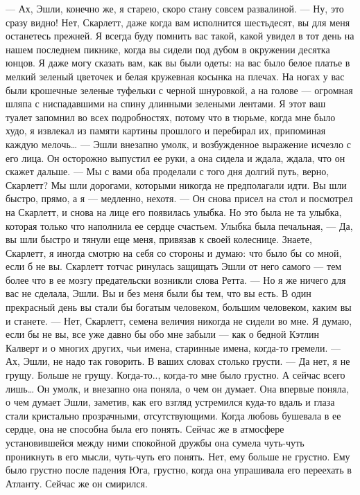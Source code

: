 — Ах, Эшли, конечно же, я старею, скоро стану совсем развалиной.
— Ну, это сразу видно! Нет, Скарлетт, даже когда вам исполнится шестьдесят, вы для меня останетесь прежней. Я всегда буду помнить вас такой, какой увидел в тот день на нашем последнем пикнике, когда вы сидели под дубом в окружении десятка юнцов. Я даже могу сказать вам, как вы были одеты: на вас было белое платье в мелкий зеленый цветочек и белая кружевная косынка на плечах. На ногах у вас были крошечные зеленые туфельки с черной шнуровкой, а на голове — огромная шляпа с ниспадавшими на спину длинными зелеными лентами. Я этот ваш туалет запомнил во всех подробностях, потому что в тюрьме, когда мне было худо, я извлекал из памяти картины прошлого и перебирал их, припоминая каждую мелочь… — Эшли внезапно умолк, и возбужденное выражение исчезло с его лица. Он осторожно выпустил ее руки, а она сидела и ждала, ждала, что он скажет дальше. — Мы с вами оба проделали с того дня долгий путь, верно, Скарлетт? Мы шли дорогами, которыми никогда не предполагали идти. Вы шли быстро, прямо, а я — медленно, нехотя. — Он снова присел на стол и посмотрел на Скарлетт, и снова на лице его появилась улыбка. Но это была не та улыбка, которая только что наполнила ее сердце счастьем. Улыбка была печальная, — Да, вы шли быстро и тянули еще меня, привязав к своей колеснице. Знаете, Скарлетт, я иногда смотрю на себя со стороны и думаю: что было бы со мной, если б не вы.
Скарлетт тотчас ринулась защищать Эшли от него самого — тем более что в ее мозгу предательски возникли слова Ретта.
— Но я же ничего для вас не сделала, Эшли. Вы и без меня были бы тем, что вы есть. В один прекрасный день вы стали бы богатым человеком, большим человеком, каким вы и станете.
— Нет, Скарлетт, семена величия никогда не сидели во мне. Я думаю, если бы не вы, все уже давно бы обо мне забыли — как о бедной Кэтлин Калверт и о многих других, чьи имена, старинные имена, когда-то гремели.
— Ах, Эшли, не надо так говорить. В ваших словах столько грусти.
— Да нет, я не грущу. Больше не грущу. Когда-то.., когда-то мне было грустно. А сейчас всего лишь…
Он умолк, и внезапно она поняла, о чем он думает. Она впервые поняла, о чем думает Эшли, заметив, как его взгляд устремился куда-то вдаль и глаза стали кристально прозрачными, отсутствующими. Когда любовь бушевала в ее сердце, она не способна была его понять. Сейчас же в атмосфере установившейся между ними спокойной дружбы она сумела чуть-чуть проникнуть в его мысли, чуть-чуть его понять. Нет, ему больше не грустно. Ему было грустно после падения Юга, грустно, когда она упрашивала его переехать в Атланту. Сейчас же он смирился.
